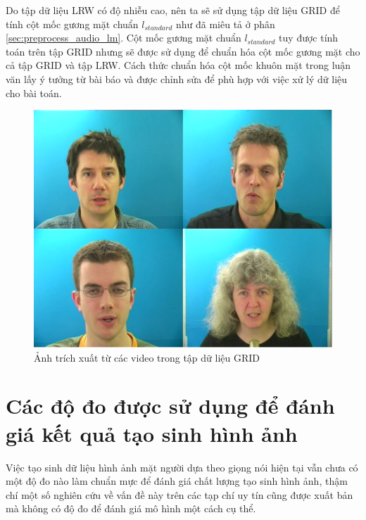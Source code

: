 Do tập dữ liệu LRW có độ nhiễu cao, nên ta sẽ sử dụng tập dữ liệu GRID để tính cột mốc gương mặt chuẩn $l_{standard}$ như đã miêu tả ở phân \ref{sec:preprocess_audio_lm}. Cột mốc gương mặt chuẩn $l_{standard}$ tuy được tính toán trên tập GRID nhưng sẽ được sử dụng để chuẩn hóa cột mốc gương mặt cho cả tập GRID và tập LRW. Cách thức chuẩn hóa cột mốc khuôn mặt trong luận văn lấy ý tưởng từ bài báo \cite{gen_face_landmark} và được chỉnh sửa để phù hợp với việc xử lý dữ liệu cho bài toán.

\begin{figure}[H]
    \centering
    \includegraphics[width=12cm]{./content/materials/grid.png}
    \caption{Ảnh trích xuất từ các video trong tập dữ liệu GRID}
\end{figure}

\section{Các độ đo được sử dụng để đánh giá kết quả tạo sinh hình ảnh}\label{sec:metrics}

Việc tạo sinh dữ liệu hình ảnh mặt người dựa theo giọng nói hiện tại vẫn chưa có một độ đo nào làm chuẩn mực để đánh giá chất lượng tạo sinh hình ảnh, thậm chí một số nghiên cứu về vấn đề này trên các tạp chí uy tín cũng được xuất bản mà không có độ đo để đánh giá mô hình một cách cụ thể. 

